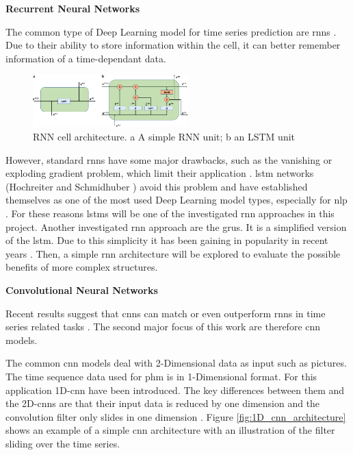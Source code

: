 \documentclass[conference]{IEEEtran}
\begin{document}
\newpage
\noindent
\textbf{Recurrent Neural Networks}

The common type of Deep Learning model for time series prediction are \glspl{rnn} \cite{Bai2018}. Due to their ability to store information within the cell, it can better remember information of a time-dependant data. 


\begin{figure}[htp]
	\centering
	\includegraphics[width=6cm]{RNN-cell-architecture.png}
	\caption{RNN cell architecture. a A simple RNN unit; b an LSTM unit \cite{Chen2021}}
	\label{fig:RNN-classification}
\end{figure}

However, standard \glspl{rnn} have some major drawbacks, such as the vanishing or exploding gradient problem, which limit their application \cite{Bengio1994}. \gls{lstm} networks (Hochreiter and Schmidhuber \cite{Hochreiter1997}) avoid this problem and have established themselves as one of the most used Deep Learning model types, especially for \gls{nlp} \cite{Wu2016}. For these reasons \glspl{lstm} will be one of the investigated \gls{rnn} approaches in this project. Another investigated \gls{rnn} approach are the \glspl{gru}. It is a simplified version of the \gls{lstm}. Due to this simplicity it has been gaining in popularity in recent years \cite{Rana2016}. Then, a simple \gls{rnn} architecture will be explored to evaluate the possible benefits of more complex structures.







\noindent
\textbf{Convolutional Neural Networks}

Recent results suggest that \glspl{cnn} can match or even outperform \glspl{rnn} in time series related tasks \cite{Bai2018}. The second major focus of this work are therefore \gls{cnn} models.

The common \gls{cnn} models deal with 2-Dimensional data as input such as pictures. The time sequence data used for \gls{phm} is in 1-Dimensional format. For this application 1D-\gls{cnn} have been introduced. The key differences between them and the 2D-\glspl{cnn} are that their input data is reduced by one dimension and the convolution filter only slides in one dimension \cite{Akrim2021}. Figure \ref{fig:1D_cnn_architecture} shows an example of a simple \gls{cnn} architecture with an illustration of the filter sliding over the time series. 
\end{document}
